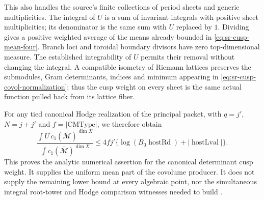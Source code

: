 This also handles the source's finite collections of
period sheets and generic multiplicities.
The integral of \(U\) is a sum of invariant integrals
with positive sheet multiplicities; its denominator
is the same sum with \(U\) replaced by \(1\).
Dividing gives a positive weighted average of the
means already bounded in
\eqref{eq:sr-cusp-mean-four}.
Branch loci and toroidal boundary divisors have zero
top-dimensional measure.  The established integrability
of \(U\) permits their removal without changing the
integral.
A compatible isometry of Riemann lattices preserves
the submodules, Gram determinants, indices and
minimum appearing in
\eqref{eq:sr-cusp-covol-normalization}; thus the cusp
weight on every sheet is the same actual function
pulled back from its lattice fiber.

For any tied canonical Hodge realization of the
principal packet, with \(q=j'\), \(N=j+j'\) and
\(f=|\mathrm{CMType}|\), we therefore obtain
\[
 \frac{\displaystyle
          \int U\,c_1(\overline{\mathcal M})^{\dim X}}
      {\displaystyle
          \int c_1(\overline{\mathcal M})^{\dim X}}
       \le4f j'
          \{\log(B_0\operatorname{hostRd})
                    +|\operatorname{hostLval}|\}.
\]
This proves the analytic numerical assertion
 for the canonical determinant cusp weight.
It supplies the uniform mean part of the covolume
producer.  It does not supply the remaining
 lower bound at every algebraic point, nor
the simultaneous integral root-tower and Hodge
comparison witnesses needed to build
.
